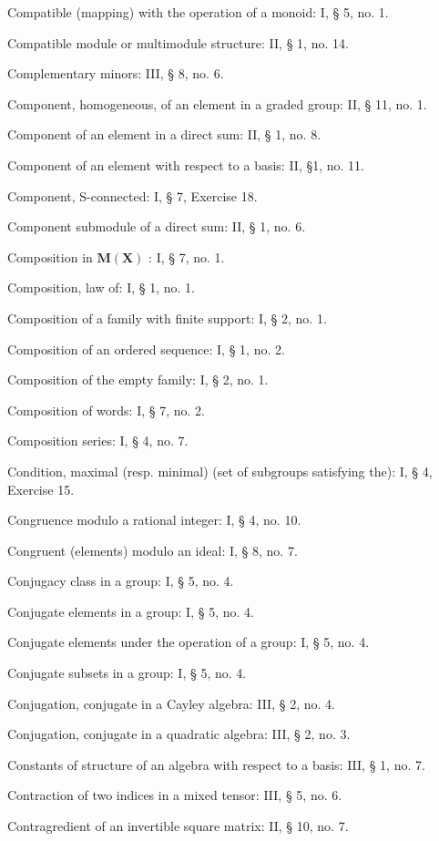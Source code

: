 Compatible (mapping) with the operation of a monoid: I, § 5, no. 1.

Compatible module or multimodule structure: II, § 1, no. 14.

Complementary minors: III, § 8, no. 6.

Component, homogeneous, of an element in a graded group: II, § 11, no. 1.

Component of an element in a direct sum: II, § 1, no. 8.

Component of an element with respect to a basis: II, §1, no. 11.

Component, S-connected: I, § 7, Exercise 18.

Component submodule of a direct sum: II, § 1, no. 6.

Composition in \(\mathbf{M}(\mathbf{X})\) : I, § 7, no. 1.

Composition, law of: I, § 1, no. 1.

Composition of a family with finite support: I, § 2, no. 1.

Composition of an ordered sequence: I, § 1, no. 2.

Composition of the empty family: I, § 2, no. 1.

Composition of words: I, § 7, no. 2.

Composition series: I, § 4, no. 7.

Condition, maximal (resp. minimal) (set of subgroups satisfying the): I, § 4, Exercise 15.

Congruence modulo a rational integer: I, § 4, no. 10.

Congruent (elements) modulo an ideal: I, § 8, no. 7.

Conjugacy class in a group: I, § 5, no. 4.

Conjugate elements in a group: I, § 5, no. 4.

Conjugate elements under the operation of a group: I, § 5, no. 4.

Conjugate subsets in a group: I, § 5, no. 4.

Conjugation, conjugate in a Cayley algebra: III, § 2, no. 4.

Conjugation, conjugate in a quadratic algebra: III, § 2, no. 3.

Constants of structure of an algebra with respect to a basis: III, § 1, no. 7.

Contraction of two indices in a mixed tensor: III, § 5, no. 6.

Contragredient of an invertible square matrix: II, § 10, no. 7.


